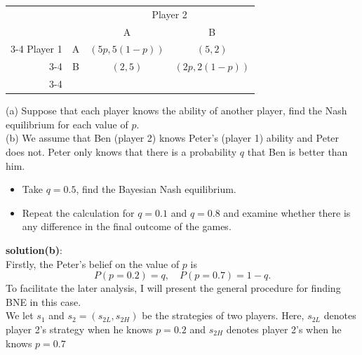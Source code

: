 \documentclass[twoside]{article}
\theoremstyle{definitionstyle}
\begin{document}
\begin{center}
    \begin{tabular}{rccc}
        & & \multicolumn{2}{c}{Player 2} \\
        & & A & B \\ \cline{3-4}
        Player 1 & A & \multicolumn{1}{|c|}{$(5p, 5(1 - p))$} & \multicolumn{1}{c|}{$(5,2)$} \\ \cline{3-4}
        & B & \multicolumn{1}{|c|}{$(2,5)$} & \multicolumn{1}{c|}{$(2p, 2(1 - p))$} \\ \cline{3-4}
    \end{tabular}
\end{center}

\noindent (a) Suppose that each player knows the ability of another player, find the Nash equilibrium for each value of $p$.\\
(b) We assume that Ben (player 2) knows Peter's (player 1) ability and Peter does not. Peter only knows that there is a probability $q$ that Ben is better than him.
\begin{itemize}
    \item[(i)] Take $q = 0.5$, find the Bayesian Nash equilibrium.
    \item[(ii)] Repeat the calculation for $q = 0.1$ and $q = 0.8$ and examine whether there is any difference in the final outcome of the games.
\end{itemize}

\textbf{solution(b)}:\\
Firstly, the Peter's belief on the value of $p$ is
\[
P(p = 0.2) = q, \quad P(p = 0.7) = 1 - q.
\]
To facilitate the later analysis, I will present the general procedure for finding BNE in this case.\\
We let $s_1$ and $s_2 = (s_{2L}, s_{2H})$ be the strategies of two players. Here, $s_{2L}$ denotes player 2's strategy when he knows $p = 0.2$ and $s_{2H}$ denotes player 2's when he knows $p = 0.7$
\end{document}
